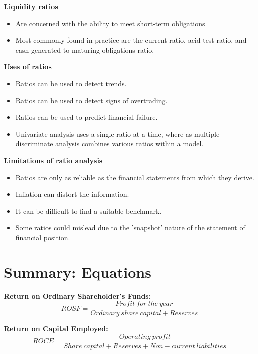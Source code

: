 \documentclass{report}
\newenvironment{blackbox}[1][Black]
  {\begin{tcolorbox}[colframe=#1,colback=white]}
  {\end{tcolorbox}}
\begin{document}
\textbf{Liquidity ratios}
\begin{itemize}
    \item Are concerned with the ability to meet short-term obligations
    \item Most commonly found in practice are the current ratio, acid test ratio, and cash generated to maturing obligations ratio.\\
\end{itemize}

\textbf{Uses of ratios}
\begin{itemize}
    \item Ratios can be used to detect trends.
    \item Ratios can be used to detect signs of overtrading.
    \item Ratios can be used to predict financial failure.
    \item Univariate analysis uses a single ratio at a time, where as multiple discriminate analysis combines various ratios within a model.
\end{itemize}

\textbf{Limitations of ratio analysis}
\begin{itemize}
    \item Ratios are only as reliable as the financial statements from which they derive.
    \item Inflation can distort the information.
    \item It can be difficult to find a suitable benchmark.
    \item Some ratios could mislead due to the 'snapshot' nature of the statement of financial position.
\end{itemize}

\chapter{Summary: Equations}

\begin{blackbox}
    \textbf{Return on Ordinary Shareholder's Funds:}
    \begin{equation}
        ROSF = \frac{Profit \: for \: the \: year}{Ordinary \: share \: capital + Reserves}
    \end{equation}
\end{blackbox}

\begin{blackbox}
    \textbf{Return on Capital Employed:}
    \begin{equation}
        ROCE = \frac{Operating \: profit}{Share \: capital +  Reserves + Non-current \: liabilities}
    \end{equation}
\end{blackbox}
\end{document}
